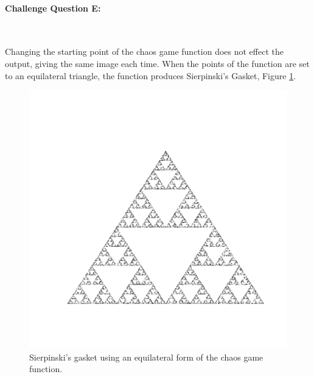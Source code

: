 \documentclass{article}
\begin{document}
\paragraph{Challenge Question E:}\

\noindent \newline Changing the starting point of the chaos game function does not effect the output, giving the same image each time. When the points of the function are set to an equilateral triangle, the function produces Sierpinski's Gasket, Figure \ref{fig:E}.

\begin{figure}[H]
	\centering
	\includegraphics[width=0.5\linewidth,trim={1cm 1cm 1cm 1cm},clip]{../Results/s_gasket.pdf}
	\caption{Sierpinski's gasket using an equilateral form of the chaos game function.}
	\label{fig:E}
\end{figure}

	
\end{document}
